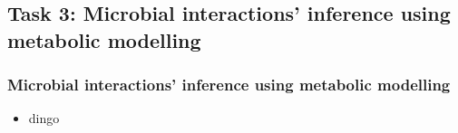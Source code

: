 \documentclass{beamer}
\begin{document}
   \begin{darkframes}
      \section{
      Task 3: Microbial interactions' inference using metabolic modelling
      }
      \begin{frame}
         \frametitle{Microbial interactions' inference using metabolic modelling}
         \begin{itemize}
            \item dingo
         \end{itemize}
      \end{frame}
   \end{darkframes}



\end{document}
